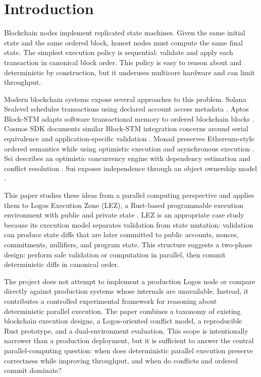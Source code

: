 \documentclass[runningheads]{llncs}
\begin{document}
\section{Introduction}

Blockchain nodes implement replicated state machines. Given the same initial state and the same ordered block, honest nodes must compute the same final state. The simplest execution policy is sequential: validate and apply each transaction in canonical block order. This policy is easy to reason about and deterministic by construction, but it underuses multicore hardware and can limit throughput.

Modern blockchain systems expose several approaches to this problem. Solana Sealevel schedules transactions using declared account access metadata \cite{solana_sealevel_2019}. Aptos Block-STM adapts software transactional memory to ordered blockchain blocks \cite{gelashvili2022blockstm}. Cosmos SDK documents similar Block-STM integration concerns around serial equivalence and application-specific validation \cite{cosmos_blockstm_docs}. Monad preserves Ethereum-style ordered semantics while using optimistic execution and asynchronous execution \cite{monad_parallel_execution_docs,monad_async_execution_docs}. Sei describes an optimistic concurrency engine with dependency estimation and conflict resolution \cite{sei_parallelization_engine_docs}. Sui exposes independence through an object ownership model \cite{sui_object_ownership_docs}.

This paper studies these ideas from a parallel computing perspective and applies them to Logos Execution Zone (LEZ), a Rust-based programmable execution environment with public and private state \cite{logos_execution_zone_github}. LEZ is an appropriate case study because its execution model separates validation from state mutation: validation can produce state diffs that are later committed to public accounts, nonces, commitments, nullifiers, and program state. This structure suggests a two-phase design: perform safe validation or computation in parallel, then commit deterministic diffs in canonical order.

The project does not attempt to implement a production Logos node or compare directly against production systems whose internals are unavailable. Instead, it contributes a controlled experimental framework for reasoning about deterministic parallel execution. The paper combines a taxonomy of existing blockchain execution designs, a Logos-oriented conflict model, a reproducible Rust prototype, and a dual-environment evaluation. This scope is intentionally narrower than a production deployment, but it is sufficient to answer the central parallel-computing question: when does deterministic parallel execution preserve correctness while improving throughput, and when do conflicts and ordered commit dominate?
\end{document}
